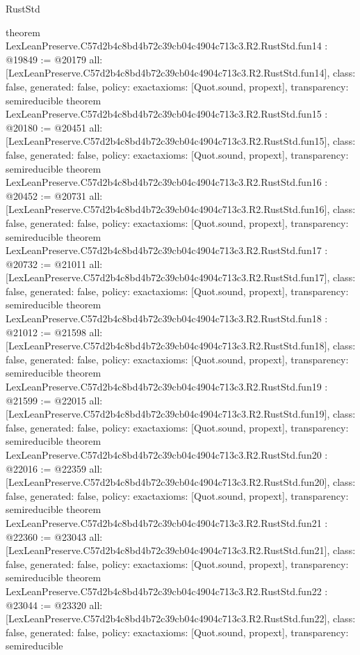 \begin{lexlean}{RustStd}
\begin{coremodule}
{}
theorem LexLeanPreserve.C57d2b4c8bd4b72c39cb04c4904c713c3.R2.RustStd.fun14 : @19849 := @20179 {
  all: [LexLeanPreserve.C57d2b4c8bd4b72c39cb04c4904c713c3.R2.RustStd.fun14],
  class: false,
  generated: false,
  policy: exact{axioms: [Quot.sound, propext]},
  transparency: semireducible
}
theorem LexLeanPreserve.C57d2b4c8bd4b72c39cb04c4904c713c3.R2.RustStd.fun15 : @20180 := @20451 {
  all: [LexLeanPreserve.C57d2b4c8bd4b72c39cb04c4904c713c3.R2.RustStd.fun15],
  class: false,
  generated: false,
  policy: exact{axioms: [Quot.sound, propext]},
  transparency: semireducible
}
theorem LexLeanPreserve.C57d2b4c8bd4b72c39cb04c4904c713c3.R2.RustStd.fun16 : @20452 := @20731 {
  all: [LexLeanPreserve.C57d2b4c8bd4b72c39cb04c4904c713c3.R2.RustStd.fun16],
  class: false,
  generated: false,
  policy: exact{axioms: [Quot.sound, propext]},
  transparency: semireducible
}
theorem LexLeanPreserve.C57d2b4c8bd4b72c39cb04c4904c713c3.R2.RustStd.fun17 : @20732 := @21011 {
  all: [LexLeanPreserve.C57d2b4c8bd4b72c39cb04c4904c713c3.R2.RustStd.fun17],
  class: false,
  generated: false,
  policy: exact{axioms: [Quot.sound, propext]},
  transparency: semireducible
}
theorem LexLeanPreserve.C57d2b4c8bd4b72c39cb04c4904c713c3.R2.RustStd.fun18 : @21012 := @21598 {
  all: [LexLeanPreserve.C57d2b4c8bd4b72c39cb04c4904c713c3.R2.RustStd.fun18],
  class: false,
  generated: false,
  policy: exact{axioms: [Quot.sound, propext]},
  transparency: semireducible
}
theorem LexLeanPreserve.C57d2b4c8bd4b72c39cb04c4904c713c3.R2.RustStd.fun19 : @21599 := @22015 {
  all: [LexLeanPreserve.C57d2b4c8bd4b72c39cb04c4904c713c3.R2.RustStd.fun19],
  class: false,
  generated: false,
  policy: exact{axioms: [Quot.sound, propext]},
  transparency: semireducible
}
theorem LexLeanPreserve.C57d2b4c8bd4b72c39cb04c4904c713c3.R2.RustStd.fun20 : @22016 := @22359 {
  all: [LexLeanPreserve.C57d2b4c8bd4b72c39cb04c4904c713c3.R2.RustStd.fun20],
  class: false,
  generated: false,
  policy: exact{axioms: [Quot.sound, propext]},
  transparency: semireducible
}
theorem LexLeanPreserve.C57d2b4c8bd4b72c39cb04c4904c713c3.R2.RustStd.fun21 : @22360 := @23043 {
  all: [LexLeanPreserve.C57d2b4c8bd4b72c39cb04c4904c713c3.R2.RustStd.fun21],
  class: false,
  generated: false,
  policy: exact{axioms: [Quot.sound, propext]},
  transparency: semireducible
}
theorem LexLeanPreserve.C57d2b4c8bd4b72c39cb04c4904c713c3.R2.RustStd.fun22 : @23044 := @23320 {
  all: [LexLeanPreserve.C57d2b4c8bd4b72c39cb04c4904c713c3.R2.RustStd.fun22],
  class: false,
  generated: false,
  policy: exact{axioms: [Quot.sound, propext]},
  transparency: semireducible
}
\end{coremodule}
\end{lexlean}

